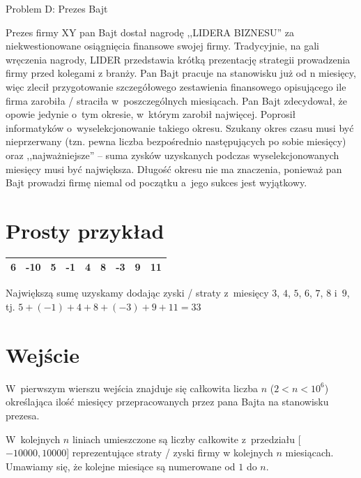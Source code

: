 \documentclass{article}
\begin{document}
\begin{center}
  \begin{Huge}
    Problem D: Prezes Bajt
  \end{Huge}
\end{center}

Prezes firmy XY pan Bajt dostał nagrodę ,,LIDERA BIZNESU'' za niekwestionowane osiągnięcia finansowe swojej firmy.
Tradycyjnie, na gali wręczenia nagrody, LIDER przedstawia krótką prezentację strategii prowadzenia firmy przed kolegami z
branży. Pan Bajt pracuje na stanowisku już od n miesięcy, więc zlecił przygotowanie szczegółowego zestawienia finansowego
opisującego ile firma zarobiła / straciła w~poszczególnych miesiącach. Pan Bajt zdecydował, że opowie jedynie o~tym okresie,
w~którym zarobił najwięcej. Poprosił informatyków o~wyselekcjonowanie takiego okresu. Szukany okres czasu musi być
nieprzerwany (tzn. pewna liczba bezpośrednio następujących po sobie miesięcy) oraz ,,najważniejsze'' -- suma zysków
uzyskanych podczas wyselekcjonowanych miesięcy musi być największa. Długość okresu nie ma znaczenia, ponieważ pan
Bajt prowadzi firmę niemal od początku a~jego sukces jest wyjątkowy.

\section*{Prosty przykład}

\begin{center}
\begin{tabular}{|c|c|c|c|c|c|c|c|c|}
  \hline
  6 & -10 & 5 & -1 & 4 & 8 & -3 & 9 & 11\\
  \hline
\end{tabular}
\end{center}

Największą sumę uzyskamy dodając zyski / straty z~miesięcy $3$, $4$, $5$, $6$, $7$, $8$ i~$9$, tj. $5 + (-1) + 4 + 8 + (-3) + 9 + 11 = 33$

\section*{Wejście}

W~pierwszym wierszu wejścia znajduje się całkowita liczba $n$ ($2 < n < 10^6$) określająca ilość miesięcy przepracowanych przez pana
Bajta na stanowisku prezesa.

W~kolejnych $n$ liniach umieszczone są liczby całkowite z~przedziału [$-10000, 10000$] reprezentujące straty / zyski firmy w
kolejnych $n$ miesiącach. Umawiamy się, że kolejne miesiące są numerowane od $1$ do $n$.
\end{document}
